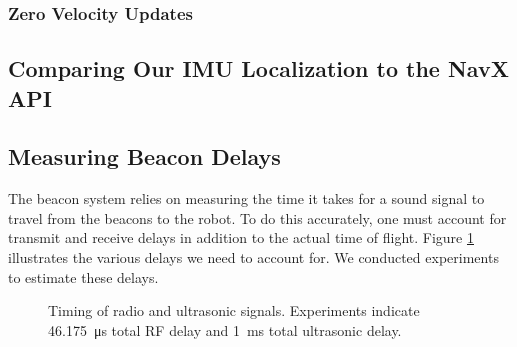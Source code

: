 \documentclass{article}
\begin{document}

    \subsubsection{Zero Velocity Updates}

  \subsection{Comparing Our IMU Localization to the NavX API} \label{section:navx_accuracy}


  \subsection{Measuring Beacon Delays}

    The beacon system relies on measuring the time it takes for a sound signal to travel from the beacons to the robot. To do this accurately, one must account for transmit and receive delays in addition to the actual time of flight. Figure \ref{fig:rx_tx_timing} illustrates the various delays we need to account for. We conducted experiments to estimate these delays.

      \begin{figure}[H]
        \centering
        \caption{Timing of radio and ultrasonic signals. Experiments indicate \SI{46.175}{\micro\second} total RF delay and \SI{1}{\milli\second} total ultrasonic delay.}
        \label{fig:rx_tx_timing}
      \end{figure}
\end{document}
